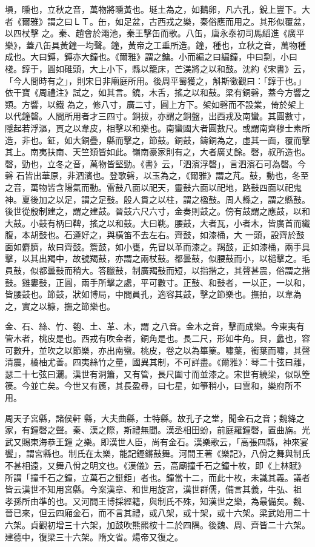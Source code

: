 \begin{pinyinscope}
 塤，曛也，立秋之音，萬物將曛黃也。埏土為之，如鵝卵，凡六孔，銳上豐下。大者《爾雅》謂之曰ＬＴ。缶，如足盆，古西戎之樂，秦俗應而用之。其形似覆盆，以四杖擊
 之。秦、趙會於澠池，秦王擊缶而歌。八缶，唐永泰初司馬縚進《廣平樂》，蓋八缶具黃鐘一均聲。鐘，黃帝之工垂所造。鐘，種也，立秋之音，萬物種成也。大曰鎛，鎛亦大鐘也。《爾雅》謂之鏞。小而編之曰編鐘，中曰剽，小曰棧。錞于，圓如碓頭，大上小下，縣以籠床，芒渼將之以和鼓。沈約《宋書》云，「今人間時有之」，則宋日非廟庭所用。後周平蜀獲之，斛斯徵觀曰：「錞于也。」依干寶《周禮注》試之，如其言。鐃，木舌，搖之以和鼓。梁有銅磬，蓋今方響之類。方響，以鐵
 為之，修八寸，廣二寸，圓上方下。架如磬而不設業，倚於架上以代鐘磬。人間所用者才三四寸。銅拔，亦謂之銅盤，出西戎及南蠻。其圓數寸，隱起若浮漚，貫之以韋皮，相擊以和樂也。南蠻國大者圓數尺。或謂南齊穆士素所造，非也。鉦，如大銅疊，縣而擊之，節鼓。銅鼓，鑄銅為之，虛其一面，覆而擊其上。南夷扶南、天竺類皆如此。嶺南豪家則有之，大者廣丈餘。磬，叔所造也。磬，勁也，立冬之音，萬物皆堅勁。《書》云，「泗濱浮磬」，言泗濱石可為磬。今磬
 石皆出華原，非泗濱也。登歌磬，以玉為之，《爾雅》謂之芃。鼓，動也，冬至之音，萬物皆含陽氣而動。雷鼓八面以祀天，靈鼓六面以祀地，路鼓四面以祀鬼神。夏後加之以足，謂之足鼓。殷人貫之以柱，謂之楹鼓。周人縣之，謂之縣鼓。後世從殷制建之，謂之建鼓。晉鼓六尺六寸，金奏則鼓之。傍有鼓謂之應鼓，以和大鼓。小鼓有柄曰鞞，搖之以和鼓。大曰鞉。腰鼓，大者瓦，小者木，皆廣首而纖腹，本胡鼓也。石遵好之，與橫笛不去左右。齊鼓，如漆桶，大
 一頭，設齊於鼓面如麝臍，故曰齊鼓。簷鼓，如小甕，先冒以革而漆之。羯鼓，正如漆桶，兩手具擊，以其出羯中，故號羯鼓，亦謂之兩杖鼓。都曇鼓，似腰鼓而小，以槌擊之。毛員鼓，似都曇鼓而稍大。答臘鼓，制廣羯鼓而短，以指揩之，其聲甚震，俗謂之揩鼓。雞婁鼓，正圓，兩手所擊之處，平可數寸。正鼓、和鼓者，一以正，一以和，皆腰鼓也。節鼓，狀如博局，中間員孔，適容其鼓，擊之節樂也。撫拍，以韋為之，實之以糠，撫之節樂也。



 金、石、絲、竹、匏、土、革、木，謂
 之八音。金木之音，擊而成樂。今東夷有管木者，桃皮是也。西戎有吹金者，銅角是也。長二尺，形如牛角。貝，蠡也，容可數升，並吹之以節樂，亦出南蠻。桃皮，卷之以為篳篥。嘯葉，銜葉而嘯，其聲清震，橘柚尤善。四夷絲竹之量，國異其制，不可詳盡。《爾雅》：琴二十弦曰離，瑟二十七弦曰灑。漢世有洞簫，又有管，長尺圍寸而並漆之。宋世有繞梁，似臥箜篌。今並亡矣。今世又有篪，其長盈尋，曰七星，如箏稍小，曰雲和，樂府所不用。



 周天子宮縣，諸侯軒
 縣，大夫曲縣，士特縣。故孔子之堂，聞金石之音；魏絳之家，有鐘磬之聲。秦、漢之際，斯禮無聞。漢丞相田蚡，前庭羅鐘磬，置曲旃。光武又賜東海恭王鐘之樂。即漢世人臣，尚有金石。漢樂歌云，「高張四縣，神來宴饗」，謂宮縣也。制氏在太樂，能記鏗鏘鼓舞。河間王著《樂記》，八佾之舞與制氏不甚相遠，又舞八佾之明文也。《漢儀》云，高廟撞千石之鐘十枚，即《上林賦》所謂「撞千石之鐘，立萬石之鋌鉅」者也。鐘當十二，而此十枚，未識其義。議者皆云漢世不知用宮縣。今案漢章、和世用旋宮，漢世群儒，備言其義，牛弘、祖
 孝孫所由準的也。又河間王博採經籍，與制氏不殊，知漢世之樂，為最備矣。魏、晉已來，但云四廂金石，而不言其禮，或八架，或十架，或十六架。梁武始用二十六架。貞觀初增三十六架，加鼓吹熊羆桉十二於四隅。後魏、周、齊皆二十六架。建德中，復梁三十六架。隋文省。煬帝又復之。




\end{pinyinscope}
